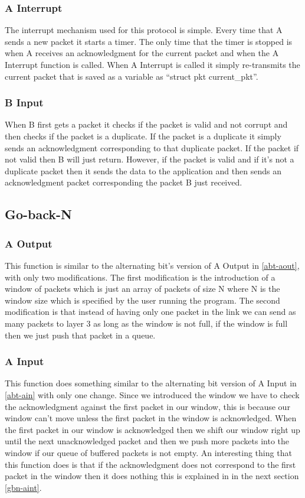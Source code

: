 \documentclass[10pt, a4paper]{article}
\begin{document}
    \subsubsection{A Interrupt\label{abt-aint}}
        The interrupt mechanism used for this protocol is simple. Every time that A sends a new packet it starts a timer. The only time that the timer is stopped is when A receives an acknowledgment for the current packet and when the A Interrupt function is called. When A Interrupt is called it simply re-transmits the current packet that is saved as a variable as ``struct pkt current\_pkt''.
    \subsubsection{B Input\label{abt-bin}}
        When B first gets a packet it checks if the packet is valid and not corrupt and then checks if the packet is a duplicate. If the packet is a duplicate it simply sends an acknowledgment corresponding to that duplicate packet. If the packet if not valid then B will just return. However, if the packet is valid and if it's not a duplicate packet then it sends the data to the application and then sends an acknowledgment packet corresponding the packet B just received. 

  \subsection{Go-back-N}
    \subsubsection{A Output\label{gbn-aout}}
        This function is similar to the alternating bit's version of A Output in \ref{abt-aout}, with only two modifications. The first modification is the introduction of a window of packets which is just an array of packets of size N where N is the window size which is specified by the user running the program. The second modification is that instead of having only one packet in the link we can send as many packets to layer 3 as long as the window is not full, if the window is full then we just push that packet in a queue. 
    \subsubsection{A Input\label{gbn-ain}}
        This function does something similar to the alternating bit version of A Input in \ref{abt-ain} with only one change. Since we introduced the window we have to check the acknowledgment against the first packet in our window, this is because our window can't move unless the first packet in the window is acknowledged. When the first packet in our window is acknowledged then we shift our window right up until the next unacknowledged packet and then we push more packets into the window if our queue of buffered packets is not empty. An interesting thing that this function does is that if the acknowledgment does not correspond to the first packet in the window then it does nothing this is explained in in the next section \ref{gbn-aint}. 
\end{document}
